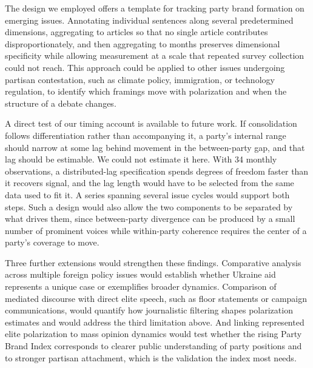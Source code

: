 The design we employed offers a template for tracking party brand formation on emerging issues. Annotating individual sentences along several predetermined dimensions, aggregating to articles so that no single article contributes disproportionately, and then aggregating to months preserves dimensional specificity while allowing measurement at a scale that repeated survey collection could not reach. This approach could be applied to other issues undergoing partisan contestation, such as climate policy, immigration, or technology regulation, to identify which framings move with polarization and when the structure of a debate changes.

A direct test of our timing account is available to future work. If consolidation follows differentiation rather than accompanying it, a party's internal range should narrow at some lag behind movement in the between-party gap, and that lag should be estimable. We could not estimate it here. With 34 monthly observations, a distributed-lag specification spends degrees of freedom faster than it recovers signal, and the lag length would have to be selected from the same data used to fit it. A series spanning several issue cycles would support both steps. Such a design would also allow the two components to be separated by what drives them, since between-party divergence can be produced by a small number of prominent voices while within-party coherence requires the center of a party's coverage to move.

Three further extensions would strengthen these findings. Comparative analysis across multiple foreign policy issues would establish whether Ukraine aid represents a unique case or exemplifies broader dynamics. Comparison of mediated discourse with direct elite speech, such as floor statements or campaign communications, would quantify how journalistic filtering shapes polarization estimates and would address the third limitation above. And linking represented elite polarization to mass opinion dynamics would test whether the rising Party Brand Index corresponds to clearer public understanding of party positions and to stronger partisan attachment, which is the validation the index most needs.
